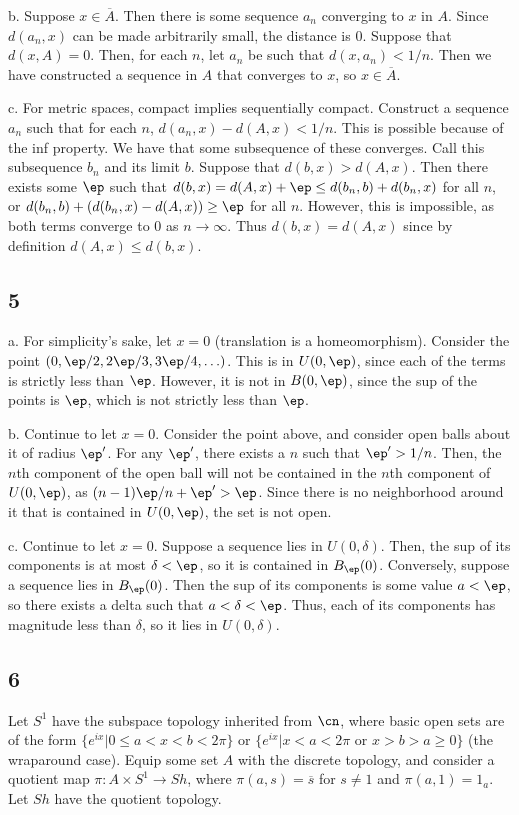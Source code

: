 \documentclass{article}
\let\bar\overline
\begin{document}
b. Suppose $x\in\bar{A}$. Then there is some sequence $a_n$ converging to $x$ in $A$. Since $d(a_n,x)$ can be made arbitrarily small, the distance is $0$. Suppose that $d(x,A)=0$. Then, for each $n$, let $a_n$ be such that $d(x,a_n)<1/n$. Then we have constructed a sequence in $A$ that converges to $x$, so $x\in\bar{A}$.

c. For metric spaces, compact implies sequentially compact. Construct a sequence $a_n$ such that for each $n$, $d(a_n,x)-d(A,x)<1/n$. This is possible because of the inf property. We have that some subsequence of these converges. Call this subsequence $b_n$ and its limit $b$. Suppose that $d(b,x)>d(A,x)$. Then there exists some $\ep$ such that $d(b,x)=d(A,x)+\ep\leq d(b_n,b)+d(b_n,x)$ for all $n$, or $d(b_n,b)+(d(b_n,x)-d(A,x))\geq\ep$ for all $n$. However, this is impossible, as both terms converge to $0$ as $n\to\infty$. Thus $d(b,x)=d(A,x)$ since by definition $d(A,x)\leq d(b,x)$.

\subsection*{5}
a. For simplicity's sake, let $x=0$ (translation is a homeomorphism). Consider the point $(0,\ep/2,2\ep/3,3\ep/4,\ldots)$. This is in $U(0,\ep)$, since each of the terms is strictly less than $\ep$. However, it is not in $B(0,\ep)$, since the sup of the points is $\ep$, which is not strictly less than $\ep$.

b. Continue to let $x=0$. Consider the point above, and consider open balls about it of radius $\ep'$. For any $\ep'$, there exists a $n$ such that $\ep'>1/n$. Then, the $n$th component of the open ball will not be contained in the $n$th component of $U(0,\ep)$, as $(n-1)\ep/n+\ep'>\ep$. Since there is no neighborhood around it that is contained in $U(0,\ep)$, the set is not open.

c. Continue to let $x=0$. Suppose a sequence lies in $U(0,\delta)$. Then, the sup of its components is at most $\delta<\ep$, so it is contained in $B_\ep(0)$. Conversely, suppose a sequence lies in $B_\ep(0)$. Then the sup of its components is some value $a<\ep$, so there exists a delta such that $a<\delta<\ep$. Thus, each of its components has magnitude less than $\delta$, so it lies in $U(0,\delta)$.

\subsection*{6}
Let $S^1$ have the subspace topology inherited from $\cn$, where basic open sets are of the form $\{e^{ix}|0\leq a<x<b<2\pi\}$ or $\{e^{ix}|x<a<2\pi\text{ or }x>b>a\geq0\}$ (the wraparound case). Equip some set $A$ with the discrete topology, and consider a quotient map $\pi:A\times S^1\to Sh$, where $\pi(a,s)=\bar{s}$ for $s\neq1$ and $\pi(a,1)=1_a$. Let $Sh$ have the quotient topology. 
\end{document}
